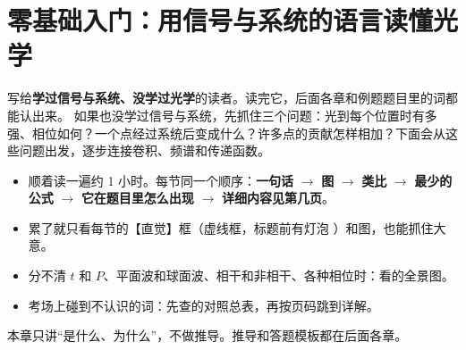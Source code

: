 \providecommand{\phead}[1]{\par\smallskip\noindent{\sffamily\bfseries\color{blue!55!black}#1}\quad}
\providecommand{\pkao}{\phead{它在题目里怎么出现}}
\providecommand{\psee}{\phead{详细内容见}}
\providecommand{\proot}[1]{\par\noindent{\sffamily\footnotesize\colorbox{gray!14}{属于：#1}}\par\smallskip}
\providecommand{\pans}[1]{\par{\footnotesize\color{black!65}\textbf{答案}\enspace #1\par}}
\providecommand{\scn}[1]{\begin{tikzpicture}[>=Stealth,baseline=(current bounding box.north),font=\scriptsize]#1\end{tikzpicture}}
\providecommand{\pnaxis}[2]{\draw[gray,thin] (#1,0)--(#2,0);}
\providecommand{\pnobj}[1]{\draw[line width=1.5pt,dash pattern=on 2.5pt off 1.5pt] (#1,-0.5)--(#1,0.5);}
\providecommand{\pnlens}[1]{\draw[thick,fill=gray!15] (#1,0) ellipse (0.07 and 0.6);}
\providecommand{\pnscr}[1]{\draw[thick] (#1,-0.55)--(#1,0.55);}
\providecommand{\pnplane}[2]{\foreach \y in {-0.3,0,0.3} \draw[->] (#1,\y)--(#2,\y);}
\providecommand{\pnsrc}[1]{\fill (#1,0) circle (1.6pt);}
\providecommand{\pndim}[3]{\draw[<->,thin] (#1,-0.72)--(#2,-0.72) node[midway,below,inner sep=1pt]{#3};}

\chapter{零基础入门：用信号与系统的语言读懂光学}\label{ch:primer}

\begin{idea}
写给\textbf{学过信号与系统、没学过光学}的读者。读完它，后面各章和例题题目里的词都能认出来。
如果也没学过信号与系统，先抓住三个问题：光到每个位置时有多强、相位如何？一个点经过系统后变成什么？许多点的贡献怎样相加？下面会从这些问题出发，逐步连接卷积、频谱和传递函数。
\begin{itemize}
\item 顺着读一遍约 1 小时。每节同一个顺序：\textbf{一句话} $\to$ \textbf{图} $\to$ \textbf{类比} $\to$ \textbf{最少的公式} $\to$ \textbf{它在题目里怎么出现} $\to$ \textbf{详细内容见第几页}。
\item 累了就只看每节的【直觉】框（虚线框，标题前有灯泡 \icoI）和图，也能抓住大意。
\item 分不清 $t$ 和 $P$、平面波和球面波、相干和非相干、各种相位时：看\pageref{sec:p-whole}的全景图。
\item 考场上碰到不认识的词：先查\pageref{sec:p-table}的对照总表，再按页码跳到详解。
\end{itemize}
本章只讲“是什么、为什么”，不做推导。推导和答题模板都在后面各章。
\end{idea}

